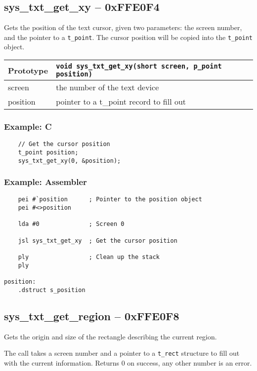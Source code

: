 \subsection*{sys\_txt\_get\_xy -- 0xFFE0F4}
Gets the position of the text cursor, given two parameters: the screen number, and the pointer to a \verb+t_point+.
The cursor position will be copied into the \verb+t_point+ object.

\bigskip

\begin{tabular}{|l||l|} \hline
Prototype & \lstinline!void sys_txt_get_xy(short screen, p_point position)! \\ \hline
screen & the number of the text device \\ \hline
position & pointer to a t\_point record to fill out \\ \hline
\end{tabular}

\subsubsection*{Example: C}
\begin{lstlisting}
    // Get the cursor position
    t_point position;
    sys_txt_get_xy(0, &position);
\end{lstlisting}

\subsubsection*{Example: Assembler}
\begin{verbatim}
    pei #`position      ; Pointer to the position object
    pei #<>position

    lda #0              ; Screen 0

    jsl sys_txt_get_xy  ; Get the cursor position

    ply                 ; Clean up the stack
    ply

position:
    .dstruct s_position
\end{verbatim}


\subsection*{sys\_txt\_get\_region -- 0xFFE0F8}
Gets the origin and size of the rectangle describing the current region.

The call takes a screen number and a pointer to a \verb+t_rect+ structure to fill out with the current information.
Returns 0 on success, any other number is an error.

